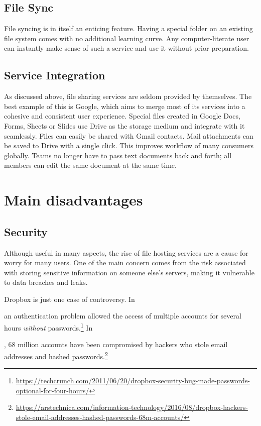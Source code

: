 \subsection{File Sync}

File syncing is in itself an enticing feature. Having a special folder on an existing file system comes with no additional learning curve. Any computer-literate user can instantly make sense of such a service and use it without prior preparation.

\subsection{Service Integration}

As discussed above, file sharing services are seldom provided by themselves. The best example of this is Google, which aims to merge most of its services into a cohesive and consistent user experience. Special files created in Google Docs, Forms, Sheets or Slides use Drive as the storage medium and integrate with it seamlessly. Files can easily be shared with Gmail contacts. Mail attachments can be saved to Drive with a single click. This improves workflow of many consumers globally. Teams no longer have to pass text documents back and forth; all members can edit the same document at the same time.

\section{Main disadvantages}

\subsection{Security}

Although useful in many aspects, the rise of file hosting services are a cause for worry for many users. One of the main concern comes from the risk associated with storing sensitive information on someone else's servers, making it vulnerable to data breaches and leaks.

Dropbox is just one case of controversy. In \date{June 2011} an authentication problem allowed the access of multiple accounts for several hours \emph{without} passwords.\footnote{\url{https://techcrunch.com/2011/06/20/dropbox-security-bug-made-passwords-optional-for-four-hours/}} In \date{August 2016}, 68 million accounts have been compromised by hackers who stole email addresses and hashed passwords.\footnote{\url{https://arstechnica.com/information-technology/2016/08/dropbox-hackers-stole-email-addresses-hashed-passwords-68m-accounts/}}

